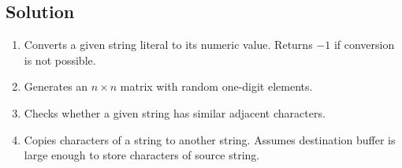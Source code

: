 
\subsection*{Solution}

\lstset{language=c,tabsize=4}
\begin{enumerate}[label=(\alph*)]
\item
Converts a given string literal to its numeric value.
Returns $-1$ if conversion is not possible.


\item
Generates an $n \times n$ matrix with random one-digit elements.


\item
Checks whether a given string has similar adjacent characters.


\item
Copies characters of a string to another string.
Assumes destination buffer is large enough to store characters of source string.

\end{enumerate}
